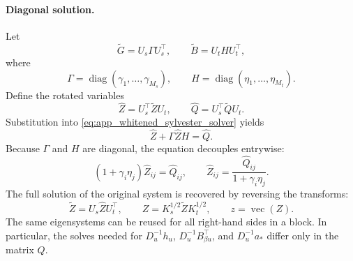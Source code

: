 \documentclass[12pt]{article}
\newcommand{\diag}{\operatorname{diag}}
\newcommand{\vecop}{\operatorname{vec}}
\begin{document}
\paragraph{Diagonal solution.}
Let
\begin{equation}
    \widetilde G=U_s\Gamma U_s^\top,
    \qquad
    \widetilde B=U_tH U_t^\top,
    \label{eq:app_eigendecomp_GB}
\end{equation}
where
\begin{equation}
    \Gamma=\diag(\gamma_1,\ldots,\gamma_{M_s}),
    \qquad
    H=\diag(\eta_1,\ldots,\eta_{M_t}).
\end{equation}
Define the rotated variables
\begin{equation}
    \widehat Z=U_s^\top\widetilde ZU_t,
    \qquad
    \widehat Q=U_s^\top\widetilde Q U_t.
    \label{eq:app_rotated_ZQ}
\end{equation}
Substitution into \eqref{eq:app_whitened_sylvester_solver} yields
\begin{equation}
    \widehat Z+\Gamma\widehat ZH=\widehat Q.
    \label{eq:app_rotated_sylvester}
\end{equation}
Because \(\Gamma\) and \(H\) are diagonal, the equation decouples entrywise:
\begin{equation}
    (1+\gamma_i\eta_j)\widehat Z_{ij}=\widehat Q_{ij},
    \qquad
    \widehat Z_{ij}=\frac{\widehat Q_{ij}}{1+\gamma_i\eta_j}.
    \label{eq:app_entrywise_solve}
\end{equation}
The full solution of the original system is recovered by reversing the transforms:
\begin{equation}
    \widetilde Z=U_s\widehat ZU_t^\top,
    \qquad
    Z=K_s^{1/2}\widetilde ZK_t^{1/2},
    \qquad
    z=\vecop(Z).
    \label{eq:app_inverse_transforms}
\end{equation}
The same eigensystems can be reused for all right-hand sides in a block.  In
particular, the solves needed for \(D_u^{-1}h_u\), \(D_u^{-1}B_{\beta u}^\top\),
and \(D_u^{-1}a_*\) differ only in the matrix \(Q\).
\end{document}
